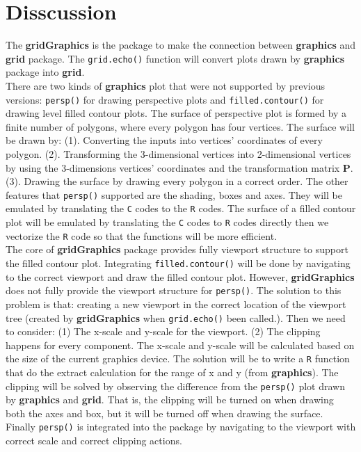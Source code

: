 \documentclass[11pt,twoside]{report}
\begin{document}
\section{Disscussion}
The \textbf{gridGraphics} is the package to make the connection between \textbf{graphics} and \textbf{grid} package. The \texttt{grid.echo()} function will convert plots drawn by \textbf{graphics} package into \textbf{grid}.\\

There are two kinds of \textbf{graphics} plot that were not supported by previous versions: \texttt{persp()} for drawing perspective plots and \texttt{filled.contour()} for drawing level filled contour plots. The surface of perspective plot is formed by a finite number of polygons, where every polygon has four vertices. The surface will be drawn by: (1). Converting the inputs into vertices' coordinates of every polygon. (2). Transforming the 3-dimensional vertices into 2-dimensional vertices by using the 3-dimensions vertices' coordinates and the transformation matrix \textbf{P}. (3). Drawing the surface by drawing every polygon in a correct order. The other features that \texttt{persp()} supported are the shading, boxes and axes. They will be emulated by translating the \texttt{C} codes to the \texttt{R} codes. The surface of a filled contour plot will be emulated by translating the \texttt{C} codes to \texttt{R} codes directly then we vectorize the \texttt{R} code so that the functions will be more efficient. \\

The core of \textbf{gridGraphics} package provides fully viewport structure to support the filled contour plot. Integrating \texttt{filled.contour()} will be done by navigating to the correct viewport and draw the filled contour plot. However, \textbf{gridGraphics} does not fully provide the viewport structure for \texttt{persp()}. The solution to this problem is that: creating a new viewport in the correct location of the viewport tree (created by \textbf{gridGraphics} when \texttt{grid.echo()} been called.). Then we need to consider: (1) The x-scale and y-scale for the viewport. (2) The clipping happens for every component. The x-scale and y-scale will be calculated based on the size of the current graphics device. The solution will be to write a \texttt{R} function that do the extract calculation for the range of x and y (from \textbf{graphics}). The clipping will be solved by observing the difference from the \texttt{persp()} plot drawn by \textbf{graphics} and \textbf{grid}. That is, the clipping will be turned on when drawing both the axes and box, but it will be turned off when drawing the surface. Finally \texttt{persp()} is integrated into the package by navigating to the viewport with correct scale and correct clipping actions.\\
\end{document}
